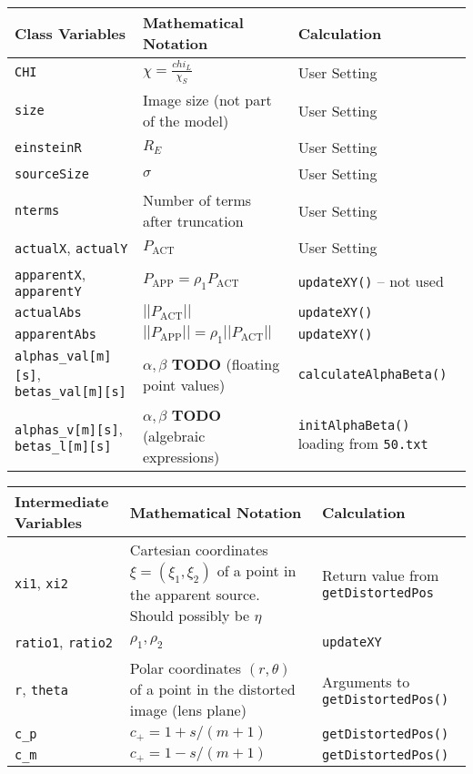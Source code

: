 \documentclass{scrartcl}
\begin{document}
\begin{center}
   \begin{tabular}{p{3cm}|p{6.5cm}|p{4cm}}
\hline
  Class Variables & Mathematical Notation & Calculation \\
\hline
\hline
   \texttt{CHI}       & $\chi=\frac{chi_L}{\chi_S}$      & User Setting \\
\hline
   \texttt{size}      & Image size (not part of the model) & User Setting \\
\hline
   \texttt{einsteinR} & $R_E$                              & User Setting \\
\hline
   \texttt{sourceSize} & $\sigma$                          & User Setting \\
\hline
   \texttt{nterms}    & Number of terms after truncation    & User Setting \\
\hline
   \texttt{actualX}, \texttt{actualY} & $P_{\textrm{ACT}}$  & User Setting\\
\hline
   \texttt{apparentX}, \texttt{apparentY} 
         & $P_{\textrm{APP}}=\rho_1P_{\textrm{ACT}}$ 
         & \texttt{updateXY()} -- not used \\
\hline
   \texttt{actualAbs} & $||P_{\textrm{ACT}}||$ & \texttt{updateXY()} \\
\hline
   \texttt{apparentAbs} & $||P_{\textrm{APP}}||=\rho_1||P_{\textrm{ACT}}||$
      & \texttt{updateXY()} \\
\hline
   \texttt{alphas\_val[m][s]},
   \texttt{betas\_val[m][s]}  & $\alpha,\beta$ \textbf{TODO}
        (floating point values)
        & \texttt{calculateAlphaBeta()} \\
\hline
   \texttt{alphas\_v[m][s]},
   \texttt{betas\_l[m][s]}  & $\alpha,\beta$ \textbf{TODO}
        (algebraic expressions)
        & \texttt{initAlphaBeta()} loading from \texttt{50.txt} \\
\hline
\end{tabular}
\end{center}

\begin{center}
   \begin{tabular}{p{2cm}|p{7cm}|p{4.5cm}}
\hline
   Intermediate Variables & Mathematical Notation & Calculation \\
\hline
\hline
   \texttt{xi1}, \texttt{xi2}       & Cartesian coordinates $\xi=(\xi_1,\xi_2)$ of a point in the apparent source.  Should possibly be $\eta$     & Return value from \texttt{getDistortedPos} \\
\hline
   \texttt{ratio1}, \texttt{ratio2} & $\rho_1,\rho_2$   & \texttt{updateXY}        \\
\hline
   \texttt{r}, \texttt{theta} & Polar coordinates $(r,\theta)$ of a point in the distorted image (lens plane) &
      Arguments to \texttt{getDistortedPos()} \\
\hline
      \texttt{c\_p} & $c_+=1+s/(m+1)$ & \texttt{getDistortedPos()} \\
\hline
      \texttt{c\_m} & $c_+=1-s/(m+1)$ & \texttt{getDistortedPos()} \\
\hline
\hline
\end{tabular}
\end{center}
\end{document}
